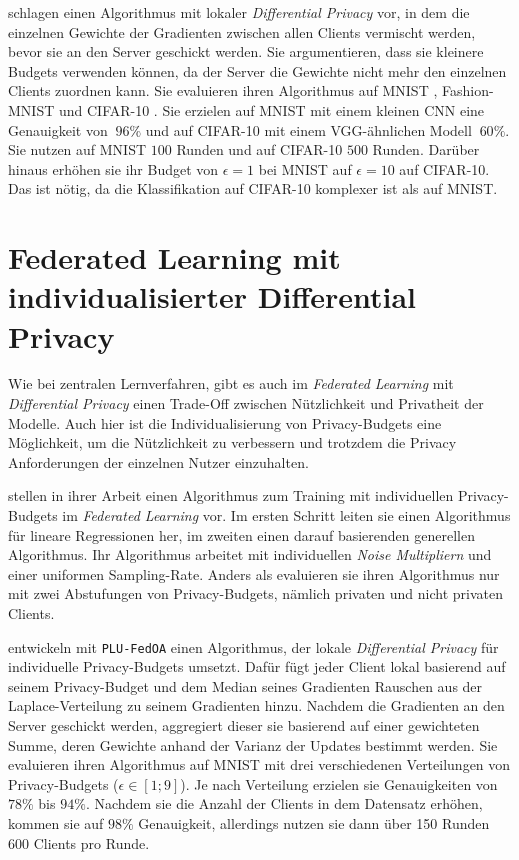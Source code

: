 \textcite{sun:2021} schlagen einen Algorithmus mit lokaler \textit{Differential Privacy} vor, in dem die einzelnen Gewichte der Gradienten zwischen allen Clients vermischt werden, bevor sie an den Server geschickt werden. Sie argumentieren, dass sie kleinere Budgets verwenden können, da der Server die Gewichte nicht mehr den einzelnen Clients zuordnen kann. Sie evaluieren ihren Algorithmus auf MNIST \cite{lecun:1998}, Fashion-MNIST \cite{xiao:2017} und CIFAR-10 \cite{krizhevsky:2009}. Sie erzielen auf MNIST mit einem kleinen CNN eine Genauigkeit von $~96\%$ und auf CIFAR-10 mit einem VGG-ähnlichen Modell $~60\%$. Sie nutzen auf MNIST $100$ Runden und auf CIFAR-10 $500$ Runden. Darüber hinaus erhöhen sie ihr Budget von $\epsilon = 1$ bei MNIST auf $\epsilon = 10$ auf CIFAR-10. Das ist nötig, da die Klassifikation auf CIFAR-10 komplexer ist als auf MNIST.


\section{Federated Learning mit individualisierter Differential Privacy}\label{sec:rw-flidp}

Wie bei zentralen Lernverfahren, gibt es auch im \textit{Federated Learning} mit \textit{Differential Privacy} einen Trade-Off zwischen Nützlichkeit und Privatheit der Modelle. Auch hier ist die Individualisierung von Privacy-Budgets eine Möglichkeit, um die Nützlichkeit zu verbessern und trotzdem die Privacy Anforderungen der einzelnen Nutzer einzuhalten.

\textcite{aldaghri:2023} stellen in ihrer Arbeit einen Algorithmus zum Training mit individuellen Privacy-Budgets im \textit{Federated Learning} vor. Im ersten Schritt leiten sie einen Algorithmus für lineare Regressionen her, im zweiten einen darauf basierenden generellen Algorithmus. Ihr Algorithmus arbeitet mit individuellen \textit{Noise Multipliern} und einer uniformen Sampling-Rate. Anders als \citeauthor{boenisch:2023} evaluieren sie ihren Algorithmus nur mit zwei Abstufungen von Privacy-Budgets, nämlich privaten und nicht privaten Clients.

\textcite{yang:2021} entwickeln mit \texttt{PLU-FedOA} einen Algorithmus, der lokale \textit{Differential Privacy} für individuelle Privacy-Budgets umsetzt. Dafür fügt jeder Client lokal basierend auf seinem Privacy-Budget und dem Median seines Gradienten Rauschen aus der Laplace-Verteilung zu seinem Gradienten hinzu. Nachdem die Gradienten an den Server geschickt werden, aggregiert dieser sie basierend auf einer gewichteten Summe, deren Gewichte anhand der Varianz der Updates bestimmt werden. Sie evaluieren ihren Algorithmus auf MNIST mit drei verschiedenen Verteilungen von Privacy-Budgets ($\epsilon \in [1;9]$). Je nach Verteilung erzielen sie Genauigkeiten von $78\%$ bis $94\%$. Nachdem sie die Anzahl der Clients in dem Datensatz erhöhen, kommen sie auf $98\%$ Genauigkeit, allerdings nutzen sie dann über 150 Runden 600 Clients pro Runde.

